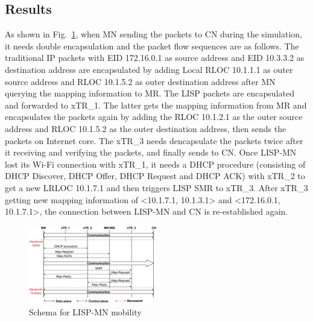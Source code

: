 \subsection{Results}
\label{sec:ns3_results}
As shown in Fig.~\ref{sim_schema}, when MN sending the packets to CN during the simulation, it needs double encapsulation and the packet flow sequences are as follows. The traditional IP packets with EID 172.16.0.1 as source address and EID 10.3.3.2 as destination address are encapsulated by adding Local RLOC 10.1.1.1 as outer source address and RLOC 10.1.5.2 as outer destination address after MN querying the mapping information to MR. The LISP packets are encapsulated and forwarded to xTR\_1. The latter gets the mapping information from MR and encapsulates the packets again by adding the RLOC 10.1.2.1 as the outer source address and RLOC 10.1.5.2 as the outer destination address, then sends the packets on Internet core. The xTR\_3 needs dencapsulate the packets twice after it receiving and verifying the packets, and finally sends to CN. Once LISP-MN lost its Wi-Fi connection with xTR\_1, it needs a DHCP procedure (consisting of DHCP Discover, DHCP Offer, DHCP Request and DHCP ACK) with xTR\_2 to get a new LRLOC 10.1.7.1 and then triggers LISP SMR to xTR\_3. After xTR\_3 getting new mapping information of <10.1.7.1, 10.1.3.1> and <172.16.0.1, 10.1.7.1>, the connection between LISP-MN and CN is re-established again.
\begin{figure}[!th]
	\centering
	\includegraphics[width=0.5\textwidth]{Pics/Mobility_router_MN_supports_LISP_schema_SMR_simplify}
	\caption{Schema for LISP-MN mobility}
	\label{sim_schema}
\end{figure}


